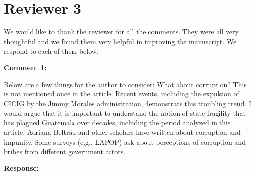 \documentclass[12pt, a4paper, notitlepage]{article}
\begin{document}
%
%
%
%
%
%
\newpage
\section*{Reviewer 3}

\textbf{{\color{red}{CHANGE }}} We would like to thank the reviewer for all the comments. They were all very thoughtful and we found them very helpful in improving the manuscript. We respond to each of them below.

\vspace{15pt}
\noindent\textbf{Comment 1:}
\begin{displayquote}
Below are a few things for the author to consider:
What about corruption? This is not mentioned once in the article. Recent events, including the expulsion of CICIG by the Jimmy Morales administration, demonstrate this troubling trend. I would argue that it is important to understand the notion of state fragility that has plagued Guatemala over decades, including the period analyzed in this article. Adriana Beltrán and other scholars have written about corruption and impunity. Some surveys (e.g., LAPOP) ask about perceptions of corruption and bribes from different government actors.
\end{displayquote}

\noindent\textbf{Response:} {}
\end{document}

